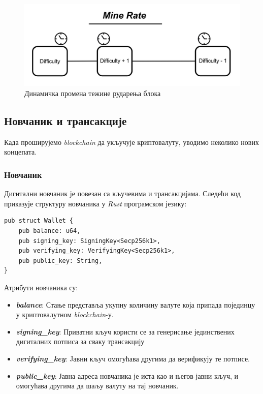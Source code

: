 \documentclass[12pt, a4paper]{article}
\begin{document}
\begin{figure}[h]
    \centering
    \includegraphics[width=0.7\linewidth]{slike/dynamic-block-difficulty.png}
    \caption{Динамичка промена тежине рударења блока}
    \label{fig:dynamic-mine-rate}
\end{figure}



\subsection{Новчаник и трансакције}
Када проширујемо \textit{blockchain} да укључује криптовалуту, уводимо неколико нових концепата.

\subsubsection{Новчаник}
Дигитални новчаник је повезан са кључевима и трансакцијама. Следећи код приказује структуру новчаника у \textit{Rust} програмском језику:

\begin{verbatim}
pub struct Wallet {
    pub balance: u64,
    pub signing_key: SigningKey<Secp256k1>,
    pub verifying_key: VerifyingKey<Secp256k1>,
    pub public_key: String,
}

\end{verbatim}


Атрибути новчаника су:
\begin{itemize}
    \item \textbf{\textit{balance}}: Стање представља укупну количину валуте која припада појединцу у криптовалутном \textit{blockchain}-у.
    \item \textbf{\textit{signing\_key}}: Приватни кључ користи се за генерисање јединствених дигиталних потписа за сваку трансакцију
    \item \textbf{\textit{verifying\_key}}: Jавни кључ омогућава другима да верификују те потписе.
    \item \textbf{\textit{public\_key}}: Јавна адреса новчаника је иста као и његов јавни кључ, и омогућава другима да шаљу валуту на тај новчаник.
\end{itemize}
\end{document}
